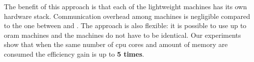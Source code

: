 			The benefit of this approach is that each of the lightweight machines has its own hardware stack.
			Communication overhead among \user{} machines is negligible compared to the one between \user{} and \server{}.
			The approach is also flexible: it is possible to use up to \oramsNumber{} \acrshort{oram} machines and the machines do not have to be identical.
			Our experiments show that when the same number of \acrshort{cpu} cores and amount of memory are consumed the efficiency gain is up to \textbf{5 times}.
